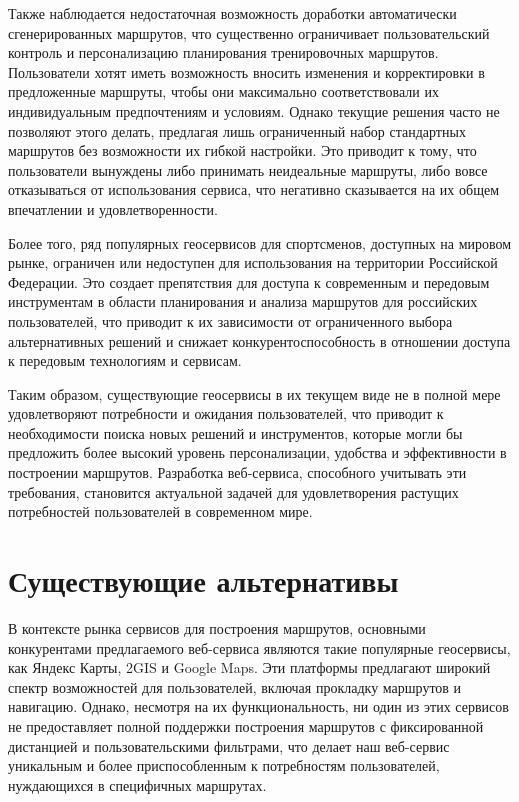 Также наблюдается недостаточная возможность доработки автоматически сгенерированных маршрутов, что существенно ограничивает пользовательский контроль и персонализацию планирования тренировочных маршрутов. Пользователи хотят иметь возможность вносить изменения и корректировки в предложенные маршруты, чтобы они максимально соответствовали их индивидуальным предпочтениям и условиям. Однако текущие решения часто не позволяют этого делать, предлагая лишь ограниченный набор стандартных маршрутов без возможности их гибкой настройки. Это приводит к тому, что пользователи вынуждены либо принимать неидеальные маршруты, либо вовсе отказываться от использования сервиса, что негативно сказывается на их общем впечатлении и удовлетворенности.

Более того, ряд популярных геосервисов для спортсменов, доступных на мировом рынке, ограничен или недоступен для использования на территории Российской Федерации. Это создает препятствия для доступа к современным и передовым инструментам в области планирования и анализа маршрутов для российских пользователей, что приводит к их зависимости от ограниченного выбора альтернативных решений и снижает конкурентоспособность в отношении доступа к передовым технологиям и сервисам.

Таким образом, существующие геосервисы в их текущем виде не в полной мере удовлетворяют потребности и ожидания пользователей, что приводит к необходимости поиска новых решений и инструментов, которые могли бы предложить более высокий уровень персонализации, удобства и эффективности в построении маршрутов. Разработка веб-сервиса, способного учитывать эти требования, становится актуальной задачей для удовлетворения растущих потребностей пользователей в современном мире.


\section{Существующие альтернативы}

В контексте рынка сервисов для построения маршрутов, основными конкурентами предлагаемого веб-сервиса являются такие популярные геосервисы, как Яндекс Карты, 2GIS и Google Maps. Эти платформы предлагают широкий спектр возможностей для пользователей, включая прокладку маршрутов и навигацию. Однако, несмотря на их функциональность, ни один из этих сервисов не предоставляет полной поддержки построения маршрутов с фиксированной дистанцией и пользовательскими фильтрами, что делает наш веб-сервис уникальным и более приспособленным к потребностям пользователей, нуждающихся в специфичных маршрутах.

